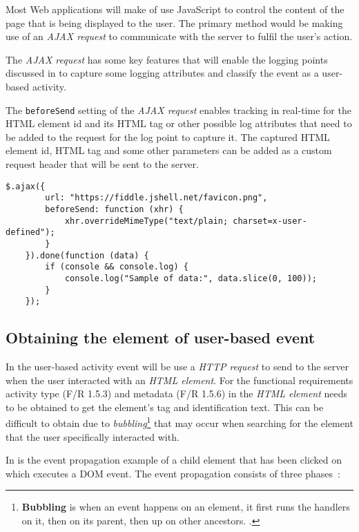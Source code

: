 Most Web applications will make of use JavaScript to control the content of the page that is being displayed to the user. The primary method would be making use of an \textit{AJAX request} to communicate with the server to fulfil the user's action.\par The \textit{AJAX request} has some key features that will enable the logging points discussed in  to capture some logging attributes and classify the event as a user-based activity. \par The \texttt{beforeSend} setting of the \textit{AJAX request} enables tracking in real-time for the HTML element id and its HTML tag or other possible log attributes that need to be added to the request for the log point to capture it. The captured HTML element id, HTML tag and some other parameters can be added as a custom request header that will be sent to the server.

\begin{lstlisting}[caption={\textit{AJAX request example \cite{API.jQuery2022}}}, label={fig:ch2_ajaxBeforesend}]  
	$.ajax({
		url: "https://fiddle.jshell.net/favicon.png",
		beforeSend: function (xhr) {
			xhr.overrideMimeType("text/plain; charset=x-user-defined");
		}
	}).done(function (data) {
		if (console && console.log) {
			console.log("Sample of data:", data.slice(0, 100));
		}
	});
\end{lstlisting}

\subsection{Obtaining the element of user-based event}
In  the user-based activity event will be use a \textit{HTTP request} to send to the server when the user interacted with an \textit{HTML element}. For the functional requirements activity type (F/R 1.5.3) and metadata (F/R 1.5.6) in  the \textit{HTML element} needs to be obtained to get the element's tag and identification text. This can be difficult to obtain due to \textit{bubbling}\footnote{\textbf{Bubbling} is when an event happens on an element, it first runs the handlers on it, then on its parent, then up on other ancestors. \cite{EventBubbling}.} that may occur when searching for the element that the user specifically interacted with.\par In  is the event propagation example of a child element that has been clicked on which executes a DOM event. The event propagation consists of three phases~\cite{EventBubbling}:

